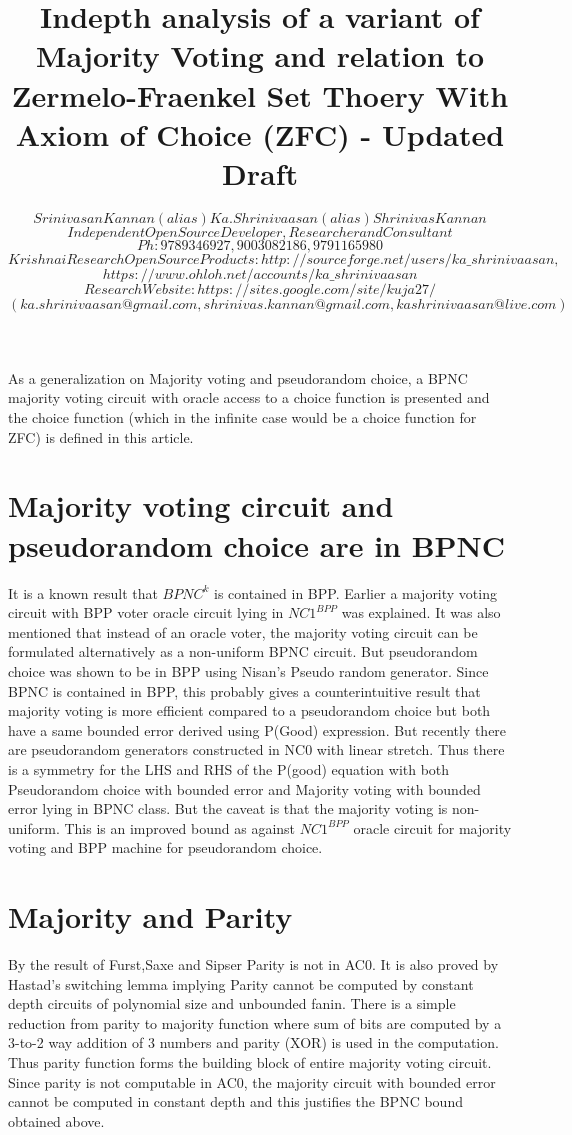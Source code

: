 \documentclass[11pt,onecolumn]{article}
\author{ $Srinivasan Kannan (alias) Ka.Shrinivaasan (alias) Shrinivas Kannan$ \\
$Independent Open Source Developer, Researcher and Consultant$ \\
$Ph: 9789346927, 9003082186, 9791165980$ \\
$Krishna iResearch OpenSource Products: http://sourceforge.net/users/ka\_shrinivaasan,$ \\ $https://www.ohloh.net/accounts/ka\_shrinivaasan$ \\
$Research Website: https://sites.google.com/site/kuja27/$ \\
$(ka.shrinivaasan@gmail.com, shrinivas.kannan@gmail.com, kashrinivaasan@live.com)$ 
}
\title{Indepth analysis of a variant of Majority Voting and relation to
Zermelo-Fraenkel Set Thoery With Axiom of Choice (ZFC) - Updated Draft }
\begin{document}
\thispagestyle{empty}
\pagestyle{empty}
\maketitle
\begin{onecolabstract}
As a generalization on Majority voting and pseudorandom choice, a BPNC majority voting
circuit with oracle access to a choice function is presented and the choice function (which in the
infinite case would be a choice function for ZFC) is defined in this article.
\end{onecolabstract}
\section{Majority voting circuit and pseudorandom choice are in BPNC}
It is a known result that $BPNC^{k}$ is contained in BPP. Earlier a majority voting circuit with BPP
voter oracle circuit lying in $NC1^{BPP}$ was explained. It was also mentioned that instead of an
oracle voter, the majority voting circuit can be formulated alternatively as a non-uniform BPNC
circuit. But pseudorandom choice was shown to be in BPP using Nisan's Pseudo random
generator. Since BPNC is contained in BPP, this probably gives a counterintuitive result that
majority voting is more efficient compared to a pseudorandom choice but both have a same
bounded error derived using P(Good) expression. But recently there are pseudorandom
generators constructed in NC0 with linear stretch. Thus there is a symmetry for the LHS and
RHS of the P(good) equation with both Pseudorandom choice with bounded error and Majority
voting with bounded error lying in BPNC class. But the caveat is that the majority voting is non-
uniform. This is an improved bound as against $NC1^{BPP}$ oracle circuit for majority voting and
BPP machine for pseudorandom choice.

\section{Majority and Parity}
By the result of Furst,Saxe and Sipser Parity is not in AC0. It is also proved by Hastad's
switching lemma implying Parity cannot be computed by constant depth circuits of polynomial
size and unbounded fanin. There is a simple reduction from parity to majority function where
sum of bits are computed by a 3-to-2 way addition of 3 numbers and parity (XOR) is used in the
computation. Thus parity function forms the building block of entire majority voting circuit.
Since parity is not computable in AC0, the majority circuit with bounded error cannot be
computed in constant depth and this justifies the BPNC bound obtained above.
\end{document}
